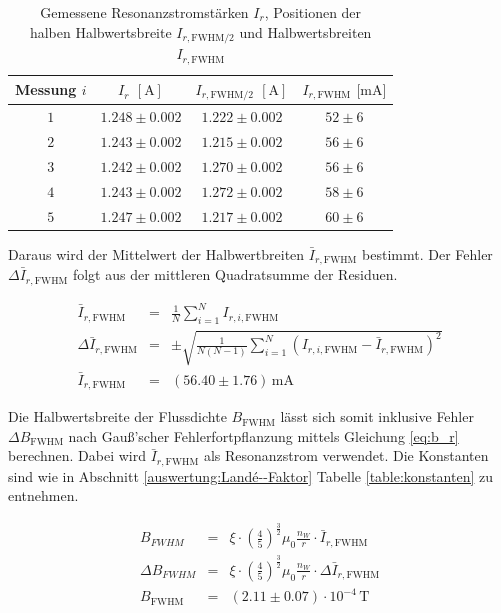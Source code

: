 \documentclass[12pt,a4paper]{scrartcl}
\numberwithin{equation}{section} %
\begin{document}
\begin{table}[h!]
	\centering
	\begin{tabular}{c|c|c|c}
		Messung $i$ & $I_r$ $[\mathrm{A}]$ & $I_{r,\mathrm{FWHM}/2}$ $[\mathrm{A}]$ & $I_{r,\mathrm{FWHM}}$ $[\mathrm{mA]}$ \\
		\hline
		$1$ & $1.248 \pm 0.002$ & $1.222 \pm 0.002$ & $52 \pm 6$ \\
		$2$ & $1.243 \pm 0.002$ & $1.215 \pm 0.002$ & $56 \pm 6$ \\
		$3$ & $1.242 \pm 0.002$ & $1.270 \pm 0.002$ & $56 \pm 6$ \\
		$4$ & $1.243 \pm 0.002$ & $1.272 \pm 0.002$ & $58 \pm 6$ \\
		$5$ & $1.247 \pm 0.002$ & $1.217 \pm 0.002$ & $60 \pm 6$
	\end{tabular}
	\caption{Gemessene Resonanzstromstärken $I_r$, Positionen der\\
		halben Halbwertsbreite $I_{r,\mathrm{FWHM}/2}$ und Halbwertsbreiten $I_{r,\mathrm{FWHM}}$}
	\label{table:halbwertsbreiten}
\end{table}

\noindent
Daraus wird der Mittelwert der Halbwertbreiten $\bar I_{r,\mathrm{FWHM}}$ bestimmt. Der Fehler $\Delta \bar I_{r,\mathrm{FWHM}}$ folgt aus der mittleren Quadratsumme der Residuen.

\begin{eqnarray}
	\bar I_{r,\mathrm{FWHM}} &=& \frac{1}{N} \sum_{i=1}^{N} I_{r,i,\mathrm{FWHM}}
	\label{eq:fwhmMittel} \\
	\Delta \bar I_{r,\mathrm{FWHM}} &=& \pm\sqrt{\frac{1}{N(N-1)}\sum_{i=1}^{N} (I_{r,i,\mathrm{FWHM}}-\bar I_{r,\mathrm{FWHM}})^2}
	\label{eq:fwhmMittelErr} \\
	\bar I_{r,\mathrm{FWHM}} &=& (56.40 \pm 1.76) \mathrm{\, mA}
\end{eqnarray}

\noindent
Die Halbwertsbreite der Flussdichte $B_\mathrm{FWHM}$ lässt sich somit inklusive Fehler $\Delta B_\mathrm{FWHM}$ nach Gauß'scher Fehlerfortpflanzung mittels Gleichung \eqref{eq:b_r} berechnen. Dabei wird $\bar I_{r,\mathrm{FWHM}}$ als Resonanzstrom verwendet. Die Konstanten sind wie in Abschnitt \ref{auswertung:Landé--Faktor} Tabelle \ref{table:konstanten} zu entnehmen.

\begin{eqnarray}
	B_{FWHM} &=& \xi \cdot \left(\frac{4}{5}\right)^{\frac{3}{2}}\mu _0 \frac{n_W}{r} \cdot \bar I_{r,\mathrm{FWHM}}
	\label{eq:b_fwhm} \\
	\Delta B_{FWHM} &=& \xi \cdot \left(\frac{4}{5}\right)^{\frac{3}{2}}\mu _0 \frac{n_W}{r} \cdot \Delta \bar I_{r,\mathrm{FWHM}} \\
	B_\mathrm{FWHM} &=& (2.11 \pm 0.07) \cdot 10^{-4} \mathrm{\, T}
\end{eqnarray}
\end{document}
